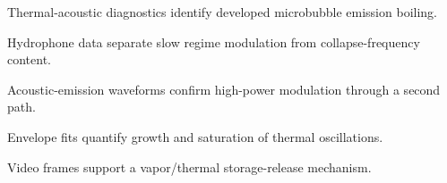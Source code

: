 \begin{highlights}
\item Thermal-acoustic diagnostics identify developed microbubble emission boiling.
\item Hydrophone data separate slow regime modulation from collapse-frequency content.
\item Acoustic-emission waveforms confirm high-power modulation through a second path.
\item Envelope fits quantify growth and saturation of thermal oscillations.
\item Video frames support a vapor/thermal storage-release mechanism.
\end{highlights}
